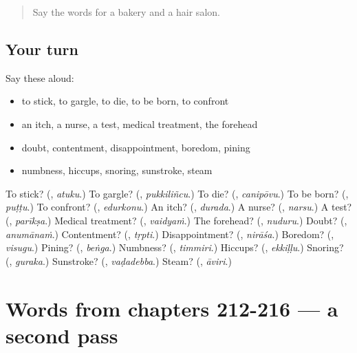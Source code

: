 \label{lesson:TE-R216-first-pass-words-from-chapters-208-211}



\begin{quote}
Say the words for a bakery and a hair salon.
\end{quote}

\subsection*{Your turn}
Say these aloud:

\begin{itemize}
\raggedright
  \item to stick, to gargle, to die, to be born, to confront
  \item an itch, a nurse, a test, medical treatment, the forehead
  \item doubt, contentment, disappointment, boredom, pining
  \item numbness, hiccups, snoring, sunstroke, steam
\end{itemize}

\begin{tcolorbox}[breakable,colback=teal!4,colframe=teal!35!black,title={Before you move on}]
To stick? (\textbf{}, \emph{atuku}.) To gargle? (\textbf{}, \emph{pukkiliñcu}.) To die? (\textbf{}, \emph{canipōvu}.) To be born? (\textbf{}, \emph{puṭṭu}.) To confront? (\textbf{}, \emph{edurkonu}.) An itch? (\textbf{}, \emph{durada}.) A nurse? (\textbf{}, \emph{narsu}.) A test? (\textbf{}, \emph{parīkṣa}.) Medical treatment? (\textbf{}, \emph{vaidyaṁ}.) The forehead? (\textbf{}, \emph{nuduru}.) Doubt? (\textbf{}, \emph{anumānaṁ}.) Contentment? (\textbf{}, \emph{tṛpti}.) Disappointment? (\textbf{}, \emph{nirāśa}.) Boredom? (\textbf{}, \emph{visugu}.) Pining? (\textbf{}, \emph{beṅga}.) Numbness? (\textbf{}, \emph{timmiri}.) Hiccups? (\textbf{}, \emph{ekkiḷḷu}.) Snoring? (\textbf{}, \emph{guraka}.) Sunstroke? (\textbf{}, \emph{vaḍadebba}.) Steam? (\textbf{}, \emph{āviri}.)
\end{tcolorbox}
\section[(dialogue)]{Words from chapters 212-216 — a second pass}

